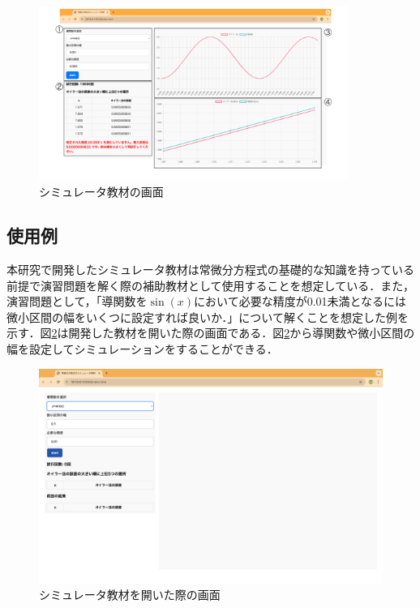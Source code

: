 \documentclass[a4paper, 12pt]{ltjsarticle}
\begin{document}
\begin{figure}[h]
\begin{center}
\includegraphics[clip,width=0.9\textwidth,keepaspectratio]{sim-image.pdf}
\end{center}
\caption{シミュレータ教材の画面}
\label{fig:シミュレータ教材の画面}
\end{figure}

\clearpage
\subsection{使用例}
本研究で開発したシミュレータ教材は常微分方程式の基礎的な知識を持っている前提で演習問題を解く際の補助教材として使用することを想定している．また，演習問題として，「導関数を$\sin(x)$において必要な精度が0.01未満となるには微小区間の幅をいくつに設定すれば良いか．」について解くことを想定した例を示す．図\ref{fig:シミュレータ教材を開いた際の画面}は開発した教材を開いた際の画面である．図\ref{fig:シミュレータ教材を開いた際の画面}から導関数や微小区間の幅を設定してシミュレーションをすることができる．

\begin{figure}[h]
\begin{center}
\includegraphics[clip,width=\textwidth,keepaspectratio]{sim-sample1.png}
\end{center}
\caption{シミュレータ教材を開いた際の画面}
\label{fig:シミュレータ教材を開いた際の画面}
\end{figure}
\end{document}
